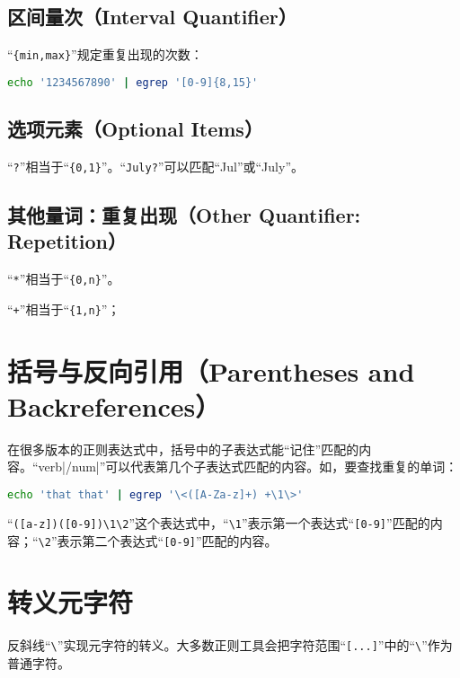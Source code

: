 \subsection{区间量次（Interval Quantifier）}

“\verb|{min,max}|”规定重复出现的次数：
\begin{lstlisting}[language=bash]
echo '1234567890' | egrep '[0-9]{8,15}' 
\end{lstlisting}

\subsection{选项元素（Optional Items）}

“\verb|?|”相当于“\verb|{0,1}|”。“\verb|July?|”可以匹配“Jul”或“July”。

\subsection{其他量词：重复出现（Other Quantifier: Repetition）}

“\verb|*|”相当于“\verb|{0,n}|”。

“\verb|+|”相当于“\verb|{1,n}|”；



\section{括号与反向引用（Parentheses and Backreferences）}

在很多版本的正则表达式中，括号中的子表达式能“记住”匹配的内容。“verb|/num|”可以代表第几个子表达式匹配的内容。如，要查找重复的单词：

\begin{lstlisting}[language=bash]
echo 'that that' | egrep '\<([A-Za-z]+) +\1\>'
\end{lstlisting}

“\verb|([a-z])([0-9])\1\2|”这个表达式中，“\verb|\1|”表示第一个表达式“\verb|[0-9]|”匹配的内容；“\verb|\2|”表示第二个表达式“\verb|[0-9]|”匹配的内容。



\section{转义元字符}

反斜线“\verb|\|”实现元字符的转义。大多数正则工具会把字符范围“\verb|[...]|”中的“\verb|\|”作为普通字符。


